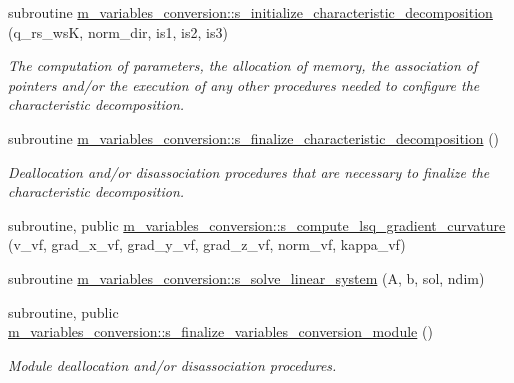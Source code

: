 \begin{DoxyCompactItemize}
subroutine \hyperlink{namespacem__variables__conversion_a3ca1b002fc78b7faad2f8638e4a42f9a}{m\+\_\+variables\+\_\+conversion\+::s\+\_\+initialize\+\_\+characteristic\+\_\+decomposition} (q\+\_\+rs\+\_\+wsK, norm\+\_\+dir, is1, is2, is3)
\begin{DoxyCompactList}\small\item\em The computation of parameters, the allocation of memory, the association of pointers and/or the execution of any other procedures needed to configure the characteristic decomposition. \end{DoxyCompactList}\item 
subroutine \hyperlink{namespacem__variables__conversion_a81e6ad74f0a2bd1b27a7873dbd797a60}{m\+\_\+variables\+\_\+conversion\+::s\+\_\+finalize\+\_\+characteristic\+\_\+decomposition} ()
\begin{DoxyCompactList}\small\item\em Deallocation and/or disassociation procedures that are necessary to finalize the characteristic decomposition. \end{DoxyCompactList}\item 
subroutine, public \hyperlink{namespacem__variables__conversion_a953abb55b23caddc730076fa837a8063}{m\+\_\+variables\+\_\+conversion\+::s\+\_\+compute\+\_\+lsq\+\_\+gradient\+\_\+curvature} (v\+\_\+vf, grad\+\_\+x\+\_\+vf, grad\+\_\+y\+\_\+vf, grad\+\_\+z\+\_\+vf, norm\+\_\+vf, kappa\+\_\+vf)
\item 
subroutine \hyperlink{namespacem__variables__conversion_afd3e70122b6f083342f644fdf5b18694}{m\+\_\+variables\+\_\+conversion\+::s\+\_\+solve\+\_\+linear\+\_\+system} (A, b, sol, ndim)
\item 
subroutine, public \hyperlink{namespacem__variables__conversion_a6a3f90e69ef4dea304495d0f7c068de2}{m\+\_\+variables\+\_\+conversion\+::s\+\_\+finalize\+\_\+variables\+\_\+conversion\+\_\+module} ()
\begin{DoxyCompactList}\small\item\em Module deallocation and/or disassociation procedures. \end{DoxyCompactList}\end{DoxyCompactItemize}
